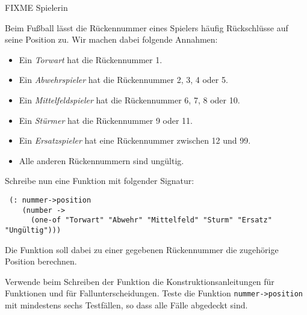 \begin{aufgabe}
  FIXME Spielerin
  
  Beim Fußball lässt die Rückennummer eines Spielers
  häufig Rückschlüsse auf seine Position zu. Wir machen dabei folgende
  Annahmen:
  \begin{itemize}
  \item Ein \emph{Torwart} hat die Rückennummer 1.
  \item Ein \emph{Abwehrspieler} hat die Rückennummer 2, 3, 4 oder 5.
  \item Ein \emph{Mittelfeldspieler} hat die Rückennummer 6, 7, 8 oder 10.
  \item Ein \emph{Stürmer} hat die Rückennummer 9 oder 11.
  \item Ein \emph{Ersatzspieler} hat eine Rückennummer zwischen 12 und 99.
  \item Alle anderen Rückennummern sind ungültig.
  \end{itemize}
 
  Schreibe nun eine Funktion mit folgender Signatur:
  
  {\small
\begin{verbatim}
 (: nummer->position
    (number ->
      (one-of "Torwart" "Abwehr" "Mittelfeld" "Sturm" "Ersatz" "Ungültig")))
\end{verbatim}
  }

  Die Funktion soll dabei zu einer gegebenen Rückennummer die
  zugehörige Position berechnen.

  Verwende beim Schreiben der Funktion die
  Konstruktionsanleitungen für Funktionen und für
  Fallunterscheidungen.  Teste die Funktion
  \texttt{nummer->position} mit mindestens sechs Testfällen, so dass
  alle Fälle abgedeckt sind.
\end{aufgabe}


